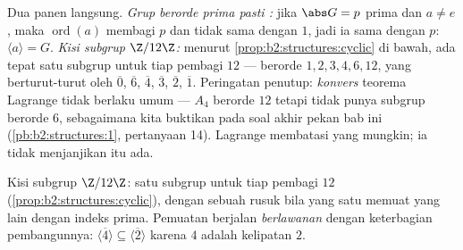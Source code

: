 \begin{example}\label{ex:b2:structures:lagrangeapp}
Dua panen langsung. \emph{Grup berorde prima pasti :}
jika $\abs G = p$ prima dan $a \neq e$, maka
$\operatorname{ord}(a)$ membagi $p$ dan tidak sama dengan $1$, jadi
ia sama dengan $p$: $\langle a\rangle = G$. \emph{Kisi subgrup
$\Z/12\Z$:} menurut \cref{prop:b2:structures:cyclic} di bawah, ada
tepat satu subgrup untuk tiap pembagi $12$ --- berorde $1, 2, 3, 4,
6, 12$, yang berturut-turut  oleh $\overline 0$, $\overline
6$, $\overline 4$, $\overline 3$, $\overline 2$, $\overline 1$.
Peringatan penutup: \emph{konvers} teorema Lagrange tidak berlaku
umum --- $A_4$ berorde $12$ tetapi tidak punya subgrup berorde $6$,
sebagaimana kita buktikan pada soal akhir pekan bab ini
(\cref{pb:b2:structures:1}, pertanyaan 14). Lagrange membatasi 
yang mungkin; ia tidak menjanjikan  itu ada.
\end{example}

\begin{omfigure}

{\small Kisi subgrup $\Z/12\Z$: satu subgrup untuk tiap
pembagi $12$ (\cref{prop:b2:structures:cyclic}), dengan sebuah
rusuk bila yang satu memuat yang lain dengan indeks prima.
Pemuatan berjalan \emph{berlawanan} dengan keterbagian pembangunnya:
$\langle\overline 4\rangle \subseteq \langle\overline2\rangle$ karena
$4$ adalah kelipatan $2$.}
\end{omfigure}

